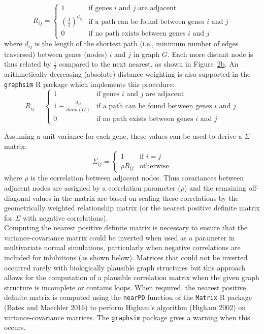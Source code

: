 \documentclass[]{article}
\begin{document}
{\[R_{ij} = 
\begin{cases}
   1                            & \mbox{if genes } i \mbox{ and } j \mbox{ are adjacent} \\
   (\frac{1}{2})^{d_{ij}}      & \mbox{if a path can be found between genes } i \mbox{ and } j \\
   0                            & \mbox{if no path exists between genes } i \mbox{ and } j 
\end{cases}\]} where \(d_{ij}\) is the length of the shortest path
(i.e., minimum number of edges traversed) between genes (nodes) \(i\)
and \(j\) in graph \(G\). Each more distant node is thus related by
\(\frac{1}{2}\) compared to the next nearest, as shown in
Figure~\protect\hyperlink{fig:simulation_activating:second}{2b}. An
arithmetically-decreasing (absolute) distance weighting is also
supported in the \texttt{graphsim} R package which implements this
procedure: {\[R_{ij} = 
\begin{cases}
   1                            & \mbox{if genes } i \mbox{ and } j \mbox{ are adjacent} \\
   1-\frac{d_{ij}}{diam(G)}     & \mbox{if a path can be found between genes } i \mbox{ and } j \\
   0                            & \mbox{if no path exists between genes } i \mbox{ and } j 
\end{cases}\]}

Assuming a unit variance for each gene, these values can be used to
derive a \(\Sigma\) matrix: \[\Sigma_{ij} = 
\begin{cases}
   1                            & \mbox{if } i=j \\
   \rho R_{ij}  & \mbox{otherwise}
\end{cases}\] where \(\rho\) is the correlation between adjacent nodes.
Thus covariances between adjacent nodes are assigned by a correlation
parameter (\(\rho\)) and the remaining off-diagonal values in the matrix
are based on scaling these correlations by the geometrically weighted
relationship matrix (or the nearest positive definite matrix for
\(\Sigma\) with negative correlations).\\
Computing the nearest positive definite matrix is necessary to ensure
that the variance-covariance matrix could be inverted when used as a
parameter in multivariate normal simulations, particularly when negative
correlations are included for inhibitions (as shown below). Matrices
that could not be inverted occurred rarely with biologically plausible
graph structures but this approach allows for the computation of a
plausible correlation matrix when the given graph structure is
incomplete or contains loops. When required, the nearest positive
definite matrix is computed using the \texttt{nearPD} function of the
\texttt{Matrix} R package (Bates and Maechler 2016) to perform Higham's
algorithm (Higham 2002) on variance-covariance matrices. The
\texttt{graphsim} package gives a warning when this occurs.
\end{document}
